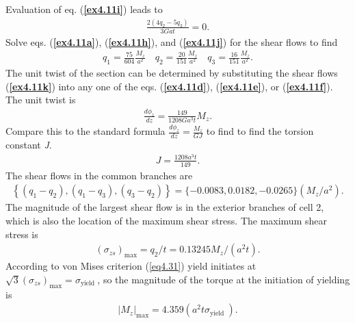 \documentclass{AeroStructure-ERJohnson}
\begin{document}
\begin{example}
Evaluation of eq. (\textbf{\ref{ex4.11i}}) leads to
\begin{align}\label{ex4.11j}
\frac{2\left(4 q_{2}-5 q_{3}\right)}{3 G a t}=0.
\end{align}
Solve eqs. (\textbf{\ref{ex4.11a}}), (\textbf{\ref{ex4.11h}}), and (\textbf{\ref{ex4.11j}}) for the shear flows to find
\begin{align}\label{ex4.11k}
q_{1}=\frac{75}{604} \frac{M_{z}}{a^{2}} \quad q_{2}=\frac{20}{151} \frac{M_{z}}{a^{2}} \quad q_{3}=\frac{16}{151} \frac{M_{z}}{a^{2}}.
\end{align}
The unit twist of the section can be determined by substituting the shear flows (\textbf{\ref{ex4.11k}}) into any one of the eqs. (\textbf{\ref{ex4.11d}}), (\textbf{\ref{ex4.11e}}), or (\textbf{\ref{ex4.11f}}). The unit twist is
\begin{align}\label{ex4.11l}
\frac{d \phi_{z}}{d z}=\frac{149}{1208 G a^{3} t} M_{z}.
\end{align}
Compare this to the standard formula $\frac{d \phi_{z}}{d z}=\frac{M_{z}}{G J}$ to find to find the torsion constant \textit{J}.
\begin{align}\label{ex4.11m}
J=\frac{1208 a^{3} t}{149}.
\end{align}
The shear flows in the common branches are
\begin{align}\label{ex4.11n}
\left\{\left(q_{1}-q_{2}\right),\left(q_{1}-q_{3}\right),\left(q_{3}-q_{2}\right)\right\}=\{-0.0083,0.0182,-0.0265\}(M_{z}/a^{2}).
\end{align}
The magnitude of the largest shear flow is in the exterior branches of cell 2, which is also the location of the maximum shear stress. The maximum shear stress is
\begin{align}\label{ex4.11o}
\left(\sigma_{z s}\right)_{\max }=q_{2}/t=0.13245 M_{z} /(a^{2} t).
\end{align}
According to von Mises criterion (\ref{eq4.31}) yield initiates at $\sqrt{3}\left(\sigma_{z s}\right)_{\max }=\sigma_{\textrm{yield }}$, so the magnitude of the torque at the initiation of yielding is
\begin{align}\label{ex4.11p}
\left|M_{z}\right|_{\max }=4.359(a^{2} t \sigma_{\textrm{yield }}).
\end{align}

\removelastskip


\end{example}
\end{document}
